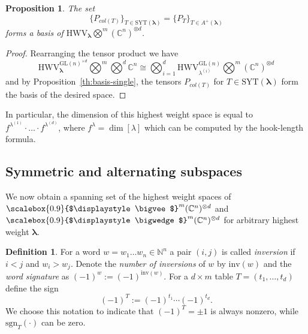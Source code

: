 \documentclass[12pt, reqno]{amsart}
\newtheorem{proposition}[theorem]{Proposition}
\newtheorem{corollary}[theorem]{Corollary}
\theoremstyle{definition}
\newtheorem{definition}[theorem]{Definition}
\newcommand{\sgn}{\mathrm{sgn}}
\newcommand{\Deltaw}{\widetilde{\Delta}}
\newcommand{\nablaw}{\widetilde{\nabla}}
\let\oldbigwedge\bigwedge
\let\oldbigvee\bigvee
\renewcommand{\bigwedge}{
  \mathop{
    \vcenter{
      \hbox{\scalebox{0.9}{$\displaystyle\oldbigwedge$}}
    }
  }
}
\renewcommand{\bigvee}{
  \mathop{
    \vcenter{
      \hbox{\scalebox{0.9}{$\displaystyle\oldbigvee$}}
    }
  }
}
\begin{document}
\begin{proposition}\label{th:tensor-basis}
    The set $$\{P_{col(T)} \}_{T \in \mathrm{SYT}(\pmb{\lambda})} = \{P_{T}\}_{T \in A^+(\pmb{\lambda})}$$ forms a basis of $\mathrm{HWV}_{\pmb{\lambda}} \bigotimes^m (\mathbb{C}^n)^{\otimes d}$.
\end{proposition}
\begin{proof}
    Rearranging the tensor product we have
    $$
        \mathrm{HWV}^{\mathrm{GL}(n)^{\times d}}_{\pmb{\lambda}} \bigotimes^m \bigotimes^d \mathbb{C}^n \cong 
        \bigotimes_{i=1}^d \mathrm{HWV}^{\mathrm{GL}(n)}_{\lambda^{(i)}} \bigotimes^m (\mathbb{C}^n)^{\otimes d}
    $$
    and by Proposition~\ref{th:basis-single}, the tensors $P_{col(T)}$ for $T \in \mathrm{SYT}(\pmb{\lambda})$ form the basis of the desired space.
\end{proof}
In particular, the dimension of this highest weight space is equal to $f^{\lambda^{(1)}} \cdot\ldots\cdot f^{\lambda^{(d)}}$, where $f^{\lambda} = \dim [\lambda]$ which can be computed by the hook-length formula.


\subsection{Symmetric and alternating subspaces}

We now obtain a spanning set of the highest weight spaces of $\bigvee^m (\mathbb{C}^n)^{\otimes d}$ and $\bigwedge^m (\mathbb{C}^n)^{\otimes d}$ for arbitrary highest weight $\pmb{\lambda}$. 
\begin{definition}\label{def:msign}
    For a word $w = w_1\ldots w_n \in \mathbb{N}^n$ a pair $(i,j)$ is called \textit{inversion} if $i < j$ and $w_i > w_j$. Denote the \textit{number of inversions} of $w$ by $\mathrm{inv}(w)$ and the \textit{word signature} as $(-1)^w := (-1)^{\mathrm{inv}(w)}$. For a $d \times m$ table $T = (t_1,\ldots,t_d)$ define the sign 
    $$(-1)^T := (-1)^{t_1}\cdots(-1)^{t_d}.$$
We choose this notation to indicate that $(-1)^T = \pm 1$ is always nonzero, while $\sgn_T(\cdot)$ can be zero.
\end{definition}
\end{document}
